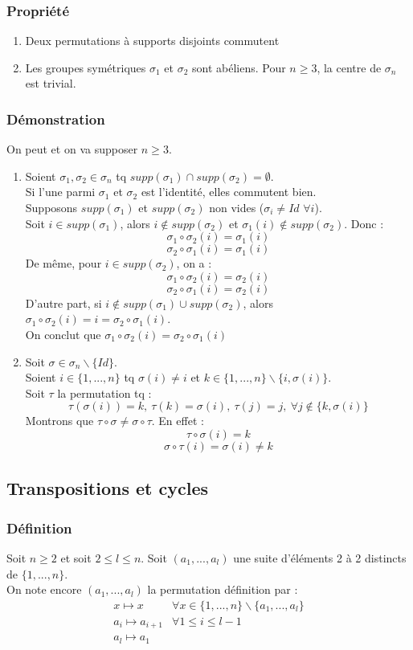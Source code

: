 \documentclass[a4paper, oneside]{report}
\newcommand{\defi}{\subsubsection{Définition}}
\newcommand{\dem}{\subsubsection{Démonstration}}
\newcommand{\propr}{\subsubsection{Propriété}}
\begin{document}
\propr
\begin{enumerate}
\item Deux permutations à supports disjoints commutent
\item Les groupes symétriques $\sigma_1$ et $\sigma_2$ sont abéliens. Pour $n\geq 3$, la centre de $\sigma_n$ est trivial.
\end{enumerate}

\dem
On peut et on va supposer $n\geq 3$.
\begin{enumerate}
\item Soient $\sigma_1,\sigma_2 \in \sigma_n$ tq $supp(\sigma_1)\cap supp(\sigma_2) = \emptyset$.\\
Si l'une parmi $\sigma_1$ et $\sigma_2$ est l'identité, elles commutent bien.\\
Supposons $supp(\sigma_1)$ et $supp(\sigma_2)$ non vides ($\sigma_i \neq Id$ $\forall i$).\\
Soit $i\in supp(\sigma_1)$, alors $i\notin supp(\sigma_2)$ et $\sigma_1(i)\notin supp(\sigma_2)$. Donc :
$$\sigma_1 \circ \sigma_2(i)=\sigma_1(i)$$
$$\sigma_2 \circ \sigma_1(i)=\sigma_1(i)$$
De même, pour $i\in supp(\sigma_2)$, on a :
$$\sigma_1 \circ \sigma_2(i)=\sigma_2(i)$$
$$\sigma_2 \circ \sigma_1(i)=\sigma_2(i)$$
D'autre part, si $i\notin supp(\sigma_1)\cup supp(\sigma_2)$, alors $\sigma_1 \circ \sigma_2(i) = i = \sigma_2 \circ \sigma_1(i)$.\\
On conclut que $\sigma_1 \circ \sigma_2(i)= \sigma_2 \circ \sigma_1(i)$

\item Soit $\sigma \in \sigma_n \backslash \{Id\}$.\\
Soient $i\in \{1,...,n\}$ tq $\sigma(i)\neq i$ et $k\in \{1,...,n\}\backslash \{i, \sigma(i) \}$.\\
Soit $\tau$ la permutation tq :
$$\tau(\sigma (i))=k,~\tau(k)=\sigma(i),~\tau(j)=j,~\forall j\notin \{k,\sigma(i) \}$$
Montrons que $\tau \circ \sigma \neq \sigma \circ \tau$. En effet :
$$\tau \circ \sigma (i) = k$$
$$\sigma \circ \tau (i) = \sigma(i) \neq k$$
\end{enumerate}

\subsection{Transpositions et cycles}

\defi
Soit $n\geq 2$ et soit $2 \leq l \leq n$. Soit $(a_1,...,a_l)$ une suite d'éléments 2 à 2 distincts de $\{1,...,n\}$. \\
On note encore $(a_1,...,a_l)$ la permutation définition par :
$$\begin{array}{ll}
x\mapsto x & \forall x \in \{1,...,n \}\backslash \{a_1,...,a_l\}\\
a_i\mapsto a_{i+1}& \forall 1\leq i \leq l-1\\
a_l\mapsto a_1&
\end{array}
$$
\end{document}
